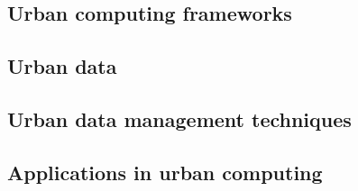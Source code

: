 \subsection{Urban computing frameworks}

\subsection{Urban data}

\subsection{Urban data management techniques}

\subsection{Applications in urban computing}

